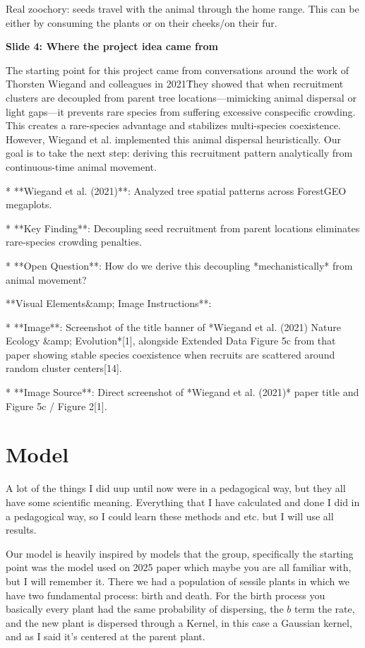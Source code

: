 \documentclass[10pt]{extarticle}
\begin{document}
Real zoochory: seeds travel with the animal through the home range. This can be either by consuming the plants or on their cheeks/on their fur.

{\bf Slide 4: Where the project idea came from}

The starting point for this project came from conversations around the work of Thorsten Wiegand and colleagues in 2021\. They showed that when recruitment clusters are decoupled from parent tree locations—mimicking animal dispersal or light gaps—it prevents rare species from suffering excessive conspecific crowding. This creates a rare-species advantage and stabilizes multi-species coexistence. However, Wiegand et al. implemented this animal dispersal heuristically. Our goal is to take the next step: deriving this recruitment pattern analytically from continuous-time animal movement.

* **Wiegand et al. (2021)**: Analyzed tree spatial patterns across ForestGEO megaplots.

* **Key Finding**: Decoupling seed recruitment from parent locations eliminates rare-species crowding penalties.

* **Open Question**: How do we derive this decoupling *mechanistically* from animal movement?

**Visual Elements\&amp; Image Instructions**:

* **Image**: Screenshot of the title banner of *Wiegand et al. (2021) Nature Ecology \&amp; Evolution*[1], alongside Extended Data Figure 5c from that paper showing stable species coexistence when recruits are scattered around random cluster centers[14].

* **Image Source**: Direct screenshot of *Wiegand et al. (2021)* paper title and Figure 5c / Figure 2[1].


\section{Model}

A lot of the things I did uup until now were in a pedagogical way, but they all have some scientific meaning. Everything that I have calculated and done I did in a pedagogical way, so I could learn these methods and etc. but I will use all results. 

Our model is heavily inspired by models that the group, specifically the starting point was the model used on 2025 paper which maybe you are all familiar with, but I will remember it. There we had a population of sessile plants in which we have two fundamental process: birth and death. For the birth process you basically every plant had the same probability of dispersing, the $b$ term the rate, and the new plant is dispersed through a Kernel, in this case a Gaussian kernel, and as I said it's centered at the parent plant.
\end{document}
